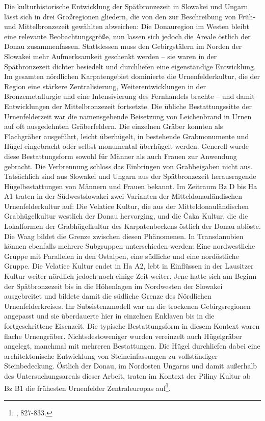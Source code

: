 \documentclass[openany,twoside,twocolumn]{book}
\let\rmarkdownfootnote\footnote%
\def\footnote{\protect\rmarkdownfootnote}
\begin{document}
Die kulturhistorische Entwicklung der Spätbronzezeit in Slowakei und Ungarn lässt sich in drei Großregionen gliedern, die von den zur Beschreibung von Früh- und Mittelbronzezeit gewählten abweichen: Die Donauregion im Westen bleibt eine relevante Beobachtungsgröße, nun lassen sich jedoch die Areale östlich der Donau zusammenfassen. Stattdessen muss den Gebirgstälern im Norden der Slowakei mehr Aufmerksamkeit geschenkt werden -- sie waren in der Spätbronzezeit dichter besiedelt und durchliefen eine eigenständige Entwicklung. Im gesamten nördlichen Karpatengebiet dominierte die Urnenfelderkultur, die der Region eine stärkere Zentralisierung, Weiterentwicklungen in der Bronzemetallurgie und eine Intensivierung des Fernhandels brachte -- und damit Entwicklungen der Mittelbronzezeit fortsetzte. Die übliche Bestattungssitte der Urnenfelderzeit war die namensgebende Beisetzung von Leichenbrand in Urnen auf oft ausgedehnten Gräberfeldern. Die einzelnen Gräber konnten als Flachgräber ausgeführt, leicht überhügelt, in bestehende Grabmonumente und Hügel eingebracht oder selbst monumental überhügelt werden. Generell wurde diese Bestattungsform sowohl für Männer als auch Frauen zur Anwendung gebracht. Die Verbrennung schloss das Einbringen von Grabbeigaben nicht aus. Tatsächlich sind aus Slowakei und Ungarn aus der Spätbronzezeit herausragende Hügelbestattungen von Männern und Frauen bekannt. Im Zeitraum Bz D bis Ha A1 traten in der Südwestslowakei zwei Varianten der Mitteldonauländischen Urnenfelderkultur auf: Die Velatice Kultur, die aus der Mitteldonauländischen Grabhügelkultur westlich der Donau hervorging, und die Čaka Kultur, die die Lokalformen der Grabhügelkultur des Karpatenbeckens östlich der Donau ablöste. Die Waag bildet die Grenze zwischen diesen Phänomenen. In Transdanubien können ebenfalls mehrere Subgruppen unterschieden werden: Eine nordwestliche Gruppe mit Parallelen in den Ostalpen, eine südliche und eine nordöstliche Gruppe. Die Velatice Kultur endet in Ha A2, lebt in Einflüssen in der Lausitzer Kultur weiter nördlich jedoch noch einige Zeit weiter. Jene hatte sich am Beginn der Spätbronzezeit bis in die Höhenlagen im Nordwesten der Slowakei ausgebreitet und bildete damit die südliche Grenze des Nördlichen Urnenfelderkreises. Ihr Subsistenzmodell war an die trockenen Gebirgsregionen angepasst und sie überdauerte hier in einzelnen Enklaven bis in die fortgeschrittene Eisenzeit. Die typische Bestattungsform in diesem Kontext waren flache Urnengräber. Nichtsdestoweniger wurden vereinzelt auch Hügelgräber angelegt, manchmal mit mehreren Bestattungen. Die Hügel durchliefen dabei eine architektonische Entwicklung von Steineinfassungen zu vollständiger Steinbedeckung. Östlich der Donau, im Nordosten Ungarns und damit außerhalb des Untersuchungsareals dieser Arbeit, traten im Kontext der Piliny Kultur ab Bz B1 die frühesten Urnenfelder Zentraleuropas auf\footnote{\textcite{markova_slovakia_2013}, 827-833.}.
\end{document}

